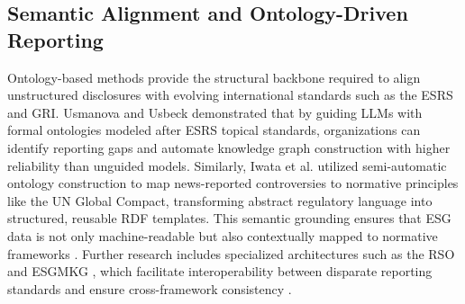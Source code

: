 \documentclass[english, online, cse, master]{dithesis}
\begin{document}
\subsection{Semantic Alignment and Ontology-Driven Reporting}

Ontology-based methods provide the structural backbone required to align unstructured disclosures with evolving international standards such as the ESRS and GRI. Usmanova and Usbeck  \parencite{aida_usmanova_e9b44e1d} demonstrated that by guiding LLMs with formal ontologies modeled after ESRS topical standards, organizations can identify reporting gaps and automate knowledge graph construction with higher reliability than unguided models. Similarly, Iwata et al.  \parencite{tsuyoshi_iwata_18ccc0b8} utilized semi-automatic ontology construction to map news-reported controversies to normative principles like the UN Global Compact, transforming abstract regulatory language into structured, reusable RDF templates. This semantic grounding ensures that ESG data is not only machine-readable but also contextually mapped to normative frameworks  \parencite{tsuyoshi_iwata_18ccc0b8}. Further research includes specialized architectures such as the RSO  \parencite{yuchen_zhou_b6beee03} and ESGMKG  \parencite{mingqin_yu_96a5b8af}, which facilitate interoperability between disparate reporting standards and ensure cross-framework consistency  \parencite{annas_vijaya_dc57c7ec}.
\end{document}
